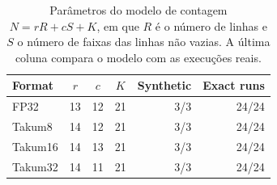 \begin{table}[t]
\caption{Parâmetros do modelo de contagem $N = rR + cS + K$, em que $R$ é o número de linhas e $S$ o número de faixas das linhas não vazias. A última coluna compara o modelo com as execuções reais.}
\label{tab:modelo}
\centering
\footnotesize
\begin{tabular}{@{}lcccrr@{}}
\toprule
Format & $r$ & $c$ & $K$ & Synthetic & Exact runs \\
\midrule
FP32 & 13 & 12 & 21 & 3/3 & 24/24 \\
Takum8 & 14 & 12 & 21 & 3/3 & 24/24 \\
Takum16 & 14 & 13 & 21 & 3/3 & 24/24 \\
Takum32 & 14 & 11 & 21 & 3/3 & 24/24 \\
\bottomrule
\end{tabular}
\end{table}
